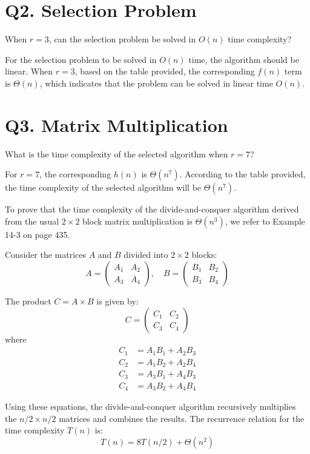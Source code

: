 \documentclass{article}
\begin{document}
\section{Q2. Selection Problem}
When \( r = 3 \), can the selection problem be solved in \( O(n) \) time complexity?

For the selection problem to be solved in \( O(n) \) time, the algorithm should be linear. When \( r = 3 \), based on the table provided, the corresponding \( f(n) \) term is \( \Theta(n) \), which indicates that the problem can be solved in linear time \( O(n) \).

\section{Q3. Matrix Multiplication}
What is the time complexity of the selected algorithm when \( r = 7 \)?

For \( r = 7 \), the corresponding \( h(n) \) is \( \Theta(n^7) \). According to the table provided, the time complexity of the selected algorithm will be \( \Theta(n^7) \).


To prove that the time complexity of the divide-and-conquer algorithm derived from the usual \(2 \times 2\) block matrix multiplication is \(\Theta(n^3)\), we refer to Example 14-3 on page 435.

Consider the matrices \(A\) and \(B\) divided into \(2 \times 2\) blocks:
\[
    A = \begin{pmatrix}
        A_1 & A_2 \\
        A_3 & A_4
    \end{pmatrix}, \quad
    B = \begin{pmatrix}
        B_1 & B_2 \\
        B_3 & B_4
    \end{pmatrix}
\]

The product \(C = A \times B\) is given by:
\[
    C = \begin{pmatrix}
        C_1 & C_2 \\
        C_3 & C_4
    \end{pmatrix}
\]
where
\begin{align*}
    C_1 & = A_1 B_1 + A_2 B_3 \\
    C_2 & = A_1 B_2 + A_2 B_4 \\
    C_3 & = A_3 B_1 + A_4 B_3 \\
    C_4 & = A_3 B_2 + A_4 B_4
\end{align*}

Using these equations, the divide-and-conquer algorithm recursively multiplies the \( n/2 \times n/2 \) matrices and combines the results. The recurrence relation for the time complexity \(T(n)\) is:
\[
    T(n) = 8T(n/2) + \Theta(n^2)
\]
\end{document}
